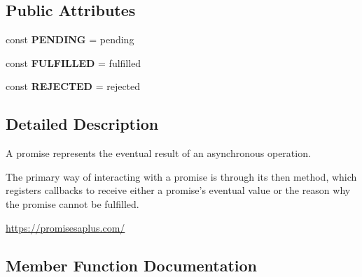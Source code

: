 \subsection*{Public Attributes}
\begin{DoxyCompactItemize}
\item 
\mbox{\label{interfaceGuzzleHttp_1_1Promise_1_1PromiseInterface_a29788ca20032af9f73bad5556c01f68c}} 
const {\bfseries P\+E\+N\+D\+I\+NG} = \textquotesingle{}pending\textquotesingle{}
\item 
\mbox{\label{interfaceGuzzleHttp_1_1Promise_1_1PromiseInterface_a817e46b9f4a975e708cf9bc0feab7956}} 
const {\bfseries F\+U\+L\+F\+I\+L\+L\+ED} = \textquotesingle{}fulfilled\textquotesingle{}
\item 
\mbox{\label{interfaceGuzzleHttp_1_1Promise_1_1PromiseInterface_a04dcd1653d073ab0e1a7e8006d0930f2}} 
const {\bfseries R\+E\+J\+E\+C\+T\+ED} = \textquotesingle{}rejected\textquotesingle{}
\end{DoxyCompactItemize}


\subsection{Detailed Description}
A promise represents the eventual result of an asynchronous operation.

The primary way of interacting with a promise is through its then method, which registers callbacks to receive either a promise’s eventual value or the reason why the promise cannot be fulfilled.

\hyperlink{}{https\+://promisesaplus.\+com/}

\subsection{Member Function Documentation}
\mbox{\label{interfaceGuzzleHttp_1_1Promise_1_1PromiseInterface_ab3f2eb63d775492446ab3784618aeef8}} 
